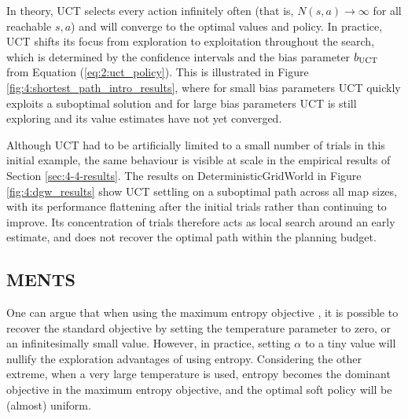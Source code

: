     In theory, UCT selects every action infinitely often (that is, $N(s,a)\rightarrow \infty$ for all reachable $s,a$) and will converge to the optimal values and policy. In practice, UCT shifts its focus from exploration to exploitation throughout the search, which is determined by the confidence intervals and the bias parameter ${b_{{\textnormal{UCT}}}}$ from Equation (\ref{eq:2:uct_policy}). This is illustrated in Figure \ref{fig:4:shortest_path_intro_results}, where for small bias parameters UCT quickly exploits a suboptimal solution and for large bias parameters UCT is still exploring and its value estimates have not yet converged.

    Although UCT had to be artificially limited to a small number of trials in this initial example, the same behaviour is visible at scale in the empirical results of Section \ref{sec:4-4-results}. The results on DeterministicGridWorld in Figure \ref{fig:4:dgw_results} show UCT settling on a suboptimal path across all map sizes, with its performance flattening after the initial trials rather than continuing to improve. Its concentration of trials therefore acts as local search around an early estimate, and does not recover the optimal path within the planning budget.

    
    

\subsection{MENTS}

    One can argue that when using the maximum entropy objective , it is possible to recover the standard objective  by setting the temperature parameter to zero, or an infinitesimally small value. However, in practice, setting $\alpha$ to a tiny value will nullify the exploration advantages of using entropy. Considering the other extreme, when a very large temperature is used, entropy becomes the dominant objective in the maximum entropy objective, and the optimal soft policy will be (almost) uniform. 

